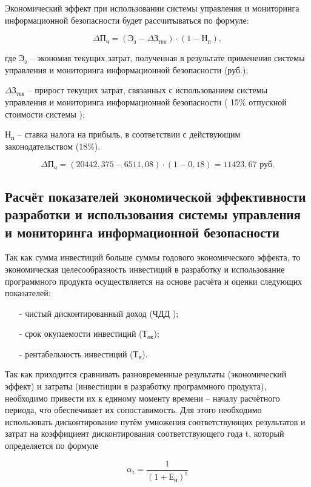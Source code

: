 Экономический эффект при использовании системы управления и мониторинга информационной безопасности будет рассчитываться по формуле:

$$
    \Delta \text{П}_{\text{ч}} = (\text{Э}_{\text{з}} - \Delta \text{З}_{\text{тек}}) \cdot (1 - \text{Н}_{\text{п}}), 
$$

где	$\text{Э}_{\text{з}}$ -- экономия текущих затрат, полученная в результате применения системы управления и мониторинга информационной безопасности (руб.); 

    $\Delta \text{З}_{\text{тек}}$ -- прирост текущих затрат, связанных с использованием системы управления и мониторинга информационной безопасности ( 15\% отпускной стоимости системы ); 
    
    $\text{Н}_{\text{п}}$ --  ставка налога на прибыль, в соответствии с действующим законодательством (18\%).

$$
    \Delta \text{П}_{\text{ч}} = (20442,375 - 6511,08) \cdot (1 - 0,18) = 11423,67 \text{ руб}.
$$


\subsection{Расчёт показателей экономической эффективности разработки и использования системы управления и мониторинга информационной безопасности}

Так как сумма инвестиций больше суммы годового экономического эффекта, то экономическая целесообразность инвестиций в разработку и использование программного продукта осуществляется на основе расчёта и оценки следующих показателей:
\begin{enumerate}
    \item[-]	чистый  дисконтированный доход (ЧДД );
    \item[-] срок окупаемости инвестиций ($\text{Т}_{\text{ок}} $);
    \item[-] рентабельность инвестиций ($\text{Т}_{\text{и}} $).
\end{enumerate}
Так как приходится сравнивать разновременные результаты (экономический эффект) и затраты (инвестиции в разработку программного продукта), необходимо привести их к единому моменту времени – началу расчётного периода, что обеспечивает их сопоставимость.
Для этого необходимо использовать дисконтирование путём умножения соответствующих результатов и затрат на коэффициент дисконтирования соответствующего года t, который определяется по формуле



$$
     \alpha_\text{t} = \frac {1}{(1 + {\text{Е}_\text{н}})^{\text{t}}}
$$

